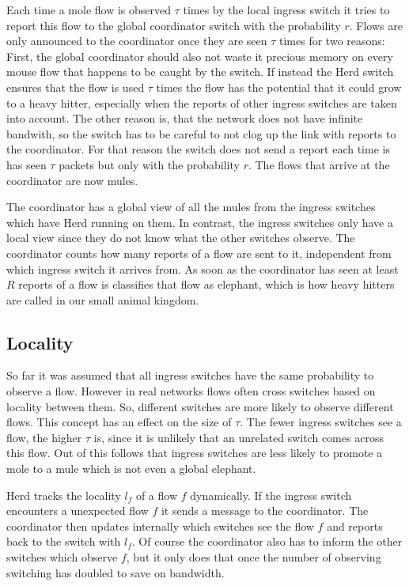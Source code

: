 \documentclass[11pt,oneside,a4paper]{article}
\begin{document}
Each time a mole flow is observed $\tau$ times by the local ingress switch it tries to report this flow to the global coordinator switch with the probability $r$. Flows are only announced to the coordinator once they are seen $\tau$ times for two reasons: First, the global coordinator should also not waste it precious memory on every mouse flow that happens to be caught by the switch. If instead the Herd switch ensures that the flow is used $\tau$ times the flow has the potential that it could grow to a heavy hitter, especially when the reports of other ingress switches are taken into account. The other reason is, that the network does not have infinite bandwith, so the switch has to be careful to not clog up the link with reports to the coordinator. For that reason the switch does not send a report each time is has seen $\tau$ packets but only with the probability $r$. The flows that arrive at the coordinator are now mules.

The coordinator has a global view of all the mules from the ingress switches which have Herd running on them. In contrast, the ingress switches only have a local view since they do not know what the other switches observe. The coordinator counts how many reports of a flow are sent to it, independent from which ingress switch it arrives from. As soon as the coordinator has seen at least $R$ reports of a flow is classifies that flow as elephant, which is how heavy hitters are called in our small animal kingdom.

\subsection{Locality} \label{locality}
So far it was assumed that all ingress switches have the same probability to observe a flow. However in real networks flows often cross switches based on locality between them. So, different switches are more likely to observe different flows. This concept has an effect on the size of $\tau$. The fewer ingress switches see a flow, the higher $\tau$ is, since it is unlikely that an unrelated switch comes across this flow. Out of this follows that ingress switches are less likely to promote a mole to a mule which is not even a global elephant. %

Herd tracks the locality $l_f$ of a flow $f$ dynamically. If the ingress switch encounters a unexpected flow $f$ it sends a message to the coordinator. The coordinator then updates internally which switches see the flow $f$ and reports back to the switch with $l_f$. Of course the coordinator also has to inform the other switches which observe $f$, but it only does that once the number of observing switching has doubled to save on bandwidth.
\end{document}
